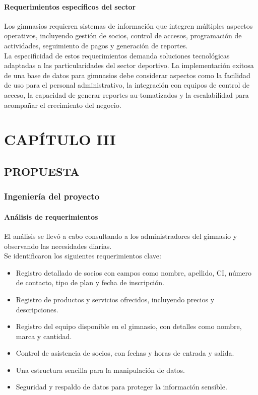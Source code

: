 \documentclass[12pt, letterpaper]{article}
\begin{document}
\paragraph{\textbf{Requerimientos específicos del sector}}
Los gimnasios requieren sistemas de información que integren múltiples aspectos operativos, incluyendo gestión de socios, control de accesos, programación de actividades, seguimiento de pagos y generación de reportes.\\
La especificidad de estos requerimientos demanda soluciones tecnológicas adaptadas a las particularidades del sector deportivo.
La implementación exitosa de una base de datos para gimnasios debe considerar aspectos como la facilidad de uso para el personal administrativo, la integración con equipos de control de acceso, la capacidad de generar reportes au-tomatizados y la escalabilidad para acompañar el crecimiento del negocio.
\newpage

\section*{CAPÍTULO III}
\setcounter{section}{3}
\subsection{PROPUESTA}
\subsubsection{Ingeniería del proyecto}
\paragraph{Análisis de requerimientos}
El análisis se llevó a cabo consultando a los administradores del gimnasio y observando las necesidades diarias.\\
Se identificaron los siguientes requerimientos clave:\\
\begin{itemize}
    \item Registro detallado de socios con campos como nombre, apellido, CI, número de contacto, tipo de plan y fecha de inscripción.
    \item Registro de productos y servicios ofrecidos, incluyendo precios y descripciones.
    \item Registro del equipo disponible en el gimnasio, con detalles como nombre, marca y cantidad.
    \item Control de asistencia de socios, con fechas y horas de entrada y salida.
    \item Una estructura sencilla para la manipulación de datos.
    \item Seguridad y respaldo de datos para proteger la información sensible.
\end{itemize}
\newpage
\end{document}
